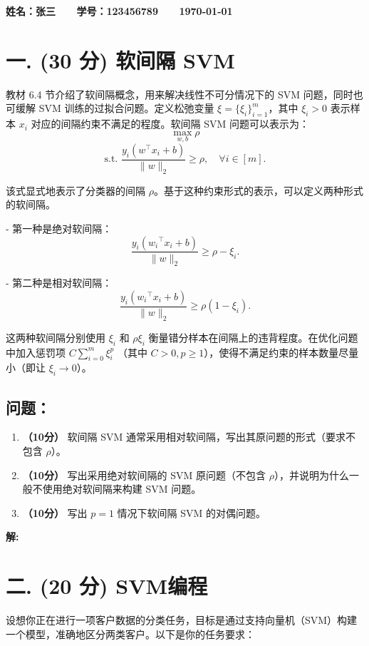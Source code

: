 \documentclass[8pt]{article}
\begin{document}
\textbf{\color{blue} \Large 姓名：张三 \ \ \ 学号：123456789 \ \ \ \today}

\section*{一. (30 分) 软间隔 SVM}
教材 6.4 节介绍了软间隔概念，用来解决线性不可分情况下的 SVM 问题，同时也可缓解 SVM 训练的过拟合问题。定义松弛变量 \( \xi = \{\xi_i\}_{i=1}^m \)，其中 \( \xi_i > 0 \) 表示样本 \( x_i \) 对应的间隔约束不满足的程度。软间隔 SVM 问题可以表示为：
\[
\max_{w, b} \rho
\]
\[
\text{s.t. } \frac{y_i (w^\top x_i + b)}{\|w\|_2} \geq \rho, \quad \forall i \in [m].
\]


该式显式地表示了分类器的间隔 \( \rho \)。基于这种约束形式的表示，可以定义两种形式的软间隔。

- 第一种是绝对软间隔：
  \[
  \frac{y_i ({w_i}^\top x_i + b)}{\|w\|_2} \geq \rho - \xi_i.
  \]

- 第二种是相对软间隔：
  \[
  \frac{y_i ({w_i}^\top x_i + b)}{\|w\|_2} \geq \rho(1 - \xi_i).
  \]

这两种软间隔分别使用 \( \xi_i \) 和 \( \rho \xi_i \) 衡量错分样本在间隔上的违背程度。在优化问题中加入惩罚项 \( C \sum_{i=0}^m \xi_i^p \) （其中 \( C > 0, p \geq 1 \)），使得不满足约束的样本数量尽量小（即让 \( \xi_i \to 0 \)）。

\subsection*{问题：}

\begin{enumerate}
    \item \textbf{（10分）} 软间隔 SVM 通常采用相对软间隔，写出其原问题的形式（要求不包含 \( \rho \)）。
    \item \textbf{（10分）} 写出采用绝对软间隔的 SVM 原问题（不包含 \( \rho \)），并说明为什么一般不使用绝对软间隔来构建 SVM 问题。
    \item \textbf{（10分）} 写出 \( p = 1 \) 情况下软间隔 SVM 的对偶问题。
\end{enumerate}


\textbf{\large 解:}

\vspace{3em}

\section*{二. (20 分) SVM编程}
设想你正在进行一项客户数据的分类任务，目标是通过支持向量机（SVM）构建一个模型，准确地区分两类客户。以下是你的任务要求：
\end{document}

